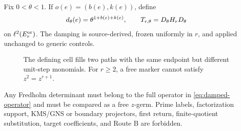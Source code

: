 Fix $0<\theta<1$.  If $o(e)=(b(e),k(e))$, define
\begin{equation}
d_\theta(e)=\theta^{1+b(e)+k(e)},
\qquad
T_{r,\theta}=D_{\theta} H_rD_{\theta}
\label{eq:damped-operator}
\end{equation}
on $\ell^2(E_r^{\mathrm{or}})$.  The damping is source-derived, frozen uniformly in $r$,
and applied unchanged to generic controls.

\begin{figure}[t]
\centering

\caption{The defining cell fills two paths with the same endpoint but
different unit-step monomials.  For $r\ge2$, a free marker cannot satisfy
$z^2=z^{r+1}$.}
\label{fig:relation-clock}
\end{figure}

\begin{convention}
Any Fredholm determinant must belong to the full operator in
\cref{eq:damped-operator} and must be compared as a free $z$-germ.  Prime
labels, factorization support, KMS/GNS or boundary projectors, first return,
finite-quotient substitution, target coefficients, and Route B are forbidden.
\end{convention}
